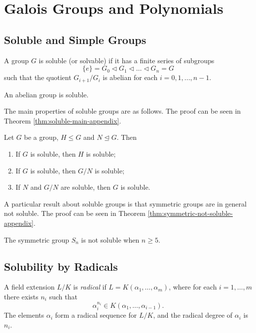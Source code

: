 \section{Galois Groups and Polynomials} \label{sec:galois-groups-and-polynomials}


\subsection{Soluble and Simple Groups}

\begin{definition} \label{def:soluble}
    A group $G$ is soluble (or solvable) if it has a finite series of subgroups 
    $$ \{ e \} = G_0 \triangleleft G_1 \triangleleft \dots \triangleleft G_n = G$$
    such that the quotient $G_{i+1} / G_{i}$ is abelian for each $i = 0, 1, ...,  n - 1$.
\end{definition}

\begin{observation}
    An abelian group is soluble. 
\end{observation}

The main properties of soluble groups are as follows. The proof can be seen in Theorem \ref{thm:soluble-main-appendix}.

\begin{theorem} \label{thm:soluble-main}
    Let $G$ be a group, $H \le G$ and $N \trianglelefteq G$. Then 
    \begin{enumerate}
        \item If $G$ is soluble, then $H$ is soluble;
        \item If $G$ is soluble, then $G / N$ is soluble; 
        \item If $N$ and $G / N$ are soluble, then $G$ is soluble. 
    \end{enumerate}
\end{theorem}

A particular result about soluble groups is that symmetric groups are in general not soluble. The proof can be seen in Theorem \ref{thm:symmetric-not-soluble-appendix}. 

\begin{theorem} \label{thm:symmetric-not-soluble}
	The symmetric group $S_n$ is not soluble when $n \ge 5$. 
\end{theorem}





\subsection{Solubility by Radicals}
\begin{definition} \label{def:radical-extension}
    A field extension $L / K$ is \textit{radical} if $L=K\left(\alpha_1, \ldots, \alpha_m\right)$, where for each $i=1, \ldots, m$ there exists $n_i$ such that
$$
\alpha_i^{n_i} \in K\left(\alpha_1, \ldots, \alpha_{i-1}\right).
$$
The elements $\alpha_i$ form a radical sequence for $L / K$, and the radical degree of $\alpha_i$ is $n_i$.
\end{definition}

